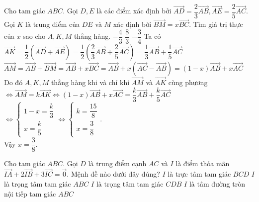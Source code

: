 \begin{ex}%
	Cho tam giác $ABC$. Gọi $D, E$ là các điểm xác định bởi $\overrightarrow{AD} = \dfrac{2}{3}\overrightarrow{AB},\overrightarrow{AE} = \dfrac{2}{5}\overrightarrow{AC}$. Gọi $K$ là trung điểm của $DE$ và $M$ xác định bởi $\overrightarrow{BM} = x\overrightarrow{BC}$. Tìm giá trị thực của $x$ sao cho $A,K,M$ thẳng hàng.
	{$-\dfrac{4}{3}$}
	{$\dfrac{8}{3}$}
	{$-\dfrac{3}{4}$}
	\loigiai
	{Ta có $\overrightarrow {AK}  = \dfrac{1}{2}\left( {\overrightarrow {AD}  + \overrightarrow {AE} } \right) = \dfrac{1}{2}\left( {\dfrac{2}{3}\overrightarrow {AB}  + \dfrac{2}{5}\overrightarrow {AC} } \right) = \dfrac{1}{3}\overrightarrow {AB}  + \dfrac{1}{5}\overrightarrow {AC} $\\
		$\overrightarrow {AM}  = \overrightarrow {AB}  + \overrightarrow {BM}  = \overrightarrow {AB}  + x\overrightarrow {BC}  = \overrightarrow {AB}  + x\left( {\overrightarrow {AC}  - \overrightarrow {AB} } \right) = \left( {1 - x} \right)\overrightarrow {AB}  + x\overrightarrow {AC} $\\
		Do đó $A,K,M$  thẳng hàng khi và chỉ khi $\overrightarrow{AM}$ và $\overrightarrow{AK}$ cùng phương\\
		$ \Leftrightarrow \overrightarrow {AM}  = k\overrightarrow {AK}  \Leftrightarrow \left( {1 - x} \right)\overrightarrow {AB}  + x\overrightarrow {AC}  = \dfrac{k}{3}\overrightarrow {AB}  + \dfrac{k}{5}\overrightarrow {AC} $\\
		$ \Leftrightarrow \left\{ \begin{array}{l}
				1 - x = \dfrac{k}{3} \\
				x = \dfrac{k}{5}
			\end{array} \right. \Leftrightarrow \left\{ \begin{array}{l}
				k = \dfrac{{15}}{8} \\
				x = \dfrac{3}{8}
			\end{array} \right.$.\\
		Vậy $x=\dfrac{3}{8}$.}
\end{ex}
\begin{ex}%
	Cho tam giác $ABC$. Gọi $D$ là trung điểm cạnh $AC$ và $I$ là điểm thỏa mãn \break $\overrightarrow{IA} +2\overrightarrow{IB} +3\overrightarrow{IC}=\overrightarrow{0}$. Mệnh đề nào dưới đây đúng?
	\choice
	{$I$ là trực tâm tam giác $BCD$}
	{$I$ là trọng tâm tam giác $ABC$}
	{\True $I$ là trọng tâm tam giác $CDB$}
	{$I$ là tâm đường tròn nội tiếp tam giác $ABC$}
\end{ex}

